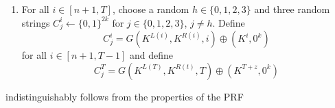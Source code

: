 \begin{itemize}
\begin{itemize}
\begin{enumerate}
            \item For all $i \in [n+1, T]$, choose a random $h \in \{0,1,2,3\}$ and three random strings $C_j^i \leftarrow \{0,1\}^{2k}$ for $j \in \{0,1,2,3\}$, $j \neq h$. Define
            \begin{equation*}
                C_j^i = G(K^{L(i)}, K^{R(i)}, i) \oplus (K^i, 0^k)
            \end{equation*}
            for all $i \in [n+1, T-1]$ and define
            \begin{equation*}
                C_j^T = G(K^{L(T)}, K^{R(t)}, T) \oplus (K^{T+z}, 0^k)
            \end{equation*}
        \end{enumerate}
        indistinguishably follows from the properties of the PRF
    \end{itemize}
\end{itemize}

